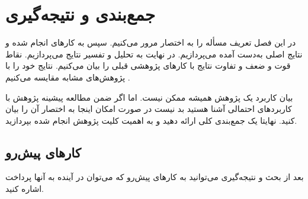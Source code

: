 \chapter{جمع‌بندی و نتیجه‌گیری}
در این فصل تعریف مسأله را به اختصار مرور می‌کنیم. سپس به کارهای انجام شده و نتایج اصلی به‌دست آمده می‌پردازیم. در نهایت به تحلیل و تفسیر نتایج می‌پردازیم. نقاط قوت و ضعف و تفاوت نتایج با کارهای پژوهشی قبلی را بیان می‌کنیم. نتایج خود را با پژوهش‌های مشابه مقایسه می‌کنیم .

بیان کاربرد یک پژوهش همیشه ممکن نیست. اما اگر ضمن مطالعه پیشینه پژوهش با کاربردهای احتمالی آشنا هستید بد نیست در صورت امکان اینجا به اختصار آن را بیان کنید. نهایتا یک جمع‌بندی کلی ارائه دهید و به اهمیت کلیت پژوهش انجام شده بپردازید.

\section{کارهای پیش‌رو}
بعد از بحث و نتیجه‌گیری می‌توانید به کارهای پیش‌رو که می‌توان در آینده به آنها پرداخت اشاره ‌کنید.
